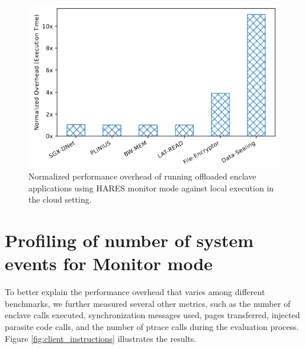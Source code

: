 \documentclass[article, doublespace,nopageskip]{VTthesis} %
\newcommand{\monitor}{HARES }
\begin{document}
        \begin{figure}[htb]
            \centering
            \includegraphics[scale=2.5]{figures/Normalized_performance.png}
            \caption{ Normalized performance overhead of running offloaded enclave applications using \monitor monitor mode against local execution in the cloud setting.} 
            \label{fig:normalized_perf}
        \end{figure}

    \section{Profiling of number of system events for Monitor mode} \label{sse:system_call_events_monitor_mode}
    To better explain the performance overhead that varies among different benchmarks, we further measured several other metrics, such as the number of enclave calls executed, synchronization messages used, pages transferred, injected parasite code calls, and the number of ptrace calls during the evaluation process. Figure \ref{fig:client_instructions} illustrates the results.
\end{document}
